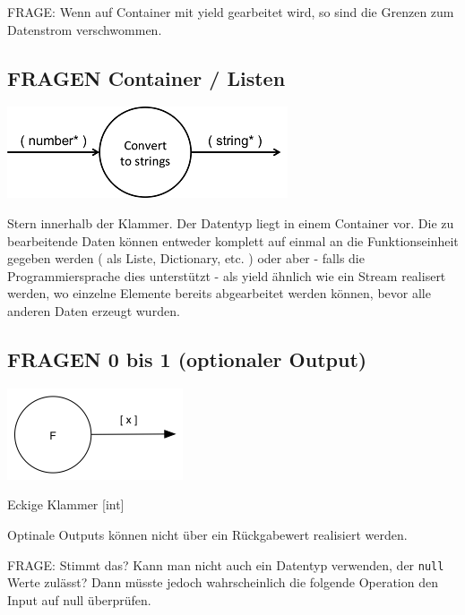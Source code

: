 \documentclass[11pt]{article}
\begin{document}
FRAGE: Wenn auf Container mit yield gearbeitet wird, so sind die Grenzen zum
Datenstrom verschwommen.
\subsection{{\bfseries\sffamily FRAGEN} Container / Listen}
\label{sec:orgheadline9}

\includegraphics[width=.9\linewidth]{./img/diagramCollection.png}

Stern innerhalb der Klammer.
Der Datentyp liegt in einem Container vor. 
Die zu bearbeitende Daten können entweder komplett auf einmal an die Funktionseinheit gegeben werden ( als Liste, Dictionary, etc. )
oder aber - falls die Programmiersprache dies unterstützt - als yield ähnlich
wie ein Stream realisert werden, wo einzelne Elemente bereits abgearbeitet werden
können, bevor alle anderen Daten erzeugt wurden.

\subsection{{\bfseries\sffamily FRAGEN} 0 bis 1 (optionaler Output)}
\label{sec:orgheadline10}

\includegraphics[width=.9\linewidth]{./img/diagramOptional.png}

Eckige Klammer
[int]

Optinale Outputs können nicht über ein Rückgabewert realisiert werden.

FRAGE: Stimmt das? Kann man nicht auch ein Datentyp verwenden, der \texttt{null} Werte zulässt?
Dann müsste jedoch wahrscheinlich die folgende Operation den Input auf null überprüfen.
\end{document}

